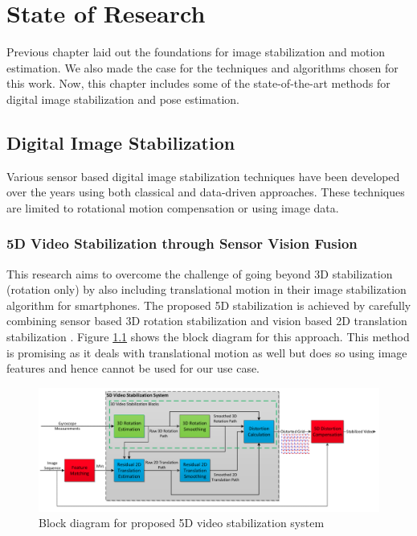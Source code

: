 \chapter{State of Research} \label{chapter_three}

Previous chapter laid out the foundations for image stabilization and motion estimation. We also made the case for the techniques and algorithms chosen for this work. Now, this chapter includes some of the state-of-the-art methods for digital image stabilization and pose estimation. 

\section{Digital Image Stabilization}
Various sensor based digital image stabilization techniques have been developed over the years using both classical and data-driven approaches. These techniques are limited to rotational motion compensation or using image data.

\subsection{5D Video Stabilization through Sensor Vision Fusion}
This research aims to overcome the challenge of going beyond 3D stabilization (rotation only) by also including translational motion in their image stabilization algorithm for smartphones. The proposed 5D stabilization is achieved by carefully combining sensor based 3D rotation stabilization and vision based 2D translation stabilization \citep{zhuang20195d}. Figure \ref{fig:5d_stab} shows the block diagram for this approach. This method is promising as it deals with translational motion as well but does so using image features and hence cannot be used for our use case.

\begin{figure}
    \centering
    \includegraphics[scale=0.21]{images/fig_chapter3/5d_stab.png}
    \caption{Block diagram for proposed 5D video stabilization system \citep{zhuang20195d}} 
    \label{fig:5d_stab}
\end{figure}

